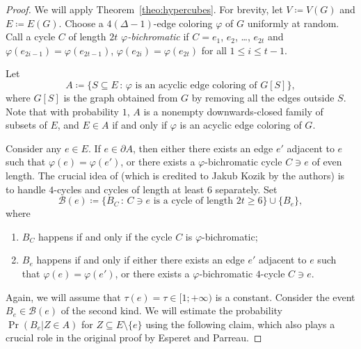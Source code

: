 \documentclass[10pt]{article}
\numberwithin{equation}{subsection}
\theoremstyle{definition}
\begin{document}
	\begin{proof}		
		We will apply Theorem~\ref{theo:hypercubes}. For brevity, let $V \coloneqq V(G)$ and $E \coloneqq E(G)$. Choose a $4(\Delta - 1)$-edge coloring $\varphi$ of $G$ uniformly at random. Call a cycle $C$ of length $2t$ \emph{$\varphi$-bichromatic} if $C= e_1$, $e_2$, \ldots, $e_{2t}$ and $\varphi(e_{2i-1}) = \varphi(e_{2t-1})$, $\varphi(e_{2i}) = \varphi(e_{2t})$ for all $1 \leq i \leq t-1$.
		
		Let
		$$
			A \coloneqq \{ S \subseteq E \,:\, \text{$\varphi$ is an acyclic edge coloring of $G[S]$}\},
		$$
		where $G[S]$ is the graph obtained from $G$ by removing all the edges outside $S$. Note that with probability $1$, $A$ is a nonempty downwards-closed family of subsets of $E$, and $E \in A$ if and only if $\varphi$ is an acyclic edge coloring of $G$.
		
		Consider any $e \in E$. If $e \in \partial A$, then either there exists an edge $e'$ adjacent to $e$ such that $\varphi(e) = \varphi(e')$, or there exists a $\varphi$-bichromatic cycle $C \ni e$ of even length. The crucial idea of \cite{Esperet} (which is credited to Jakub Kozik by the authors) is to handle $4$-cycles and cycles of length at least $6$ separately. Set
		$$
			\mathcal{B}(e) \coloneqq \{B_C \,:\, \text{$C \ni e$ is a cycle of length $2t \geq 6$}\} \cup \{B_e\},
		$$
		where
		\begin{enumerate}
			\item $B_C$ happens if and only if the cycle $C$ is $\varphi$-bichromatic;
			\item $B_e$ happens if and only if either there exists an edge $e'$ adjacent to $e$ such that $\varphi(e) = \varphi(e')$, or there exists a $\varphi$-bichromatic $4$-cycle $C \ni e$.
		\end{enumerate}
		
		Again, we will assume that $\tau(e) = \tau \in [1;+\infty)$ is a constant. Consider the event $B_e \in \mathcal{B}(e)$ of the second kind. We will estimate the probability $\Pr(B_e \vert Z \in A)$ for $Z \subseteq E \setminus \{e\}$ using the following claim, which also plays a crucial role in the original proof by Esperet and Parreau.
		

\end{proof}
\end{document}
